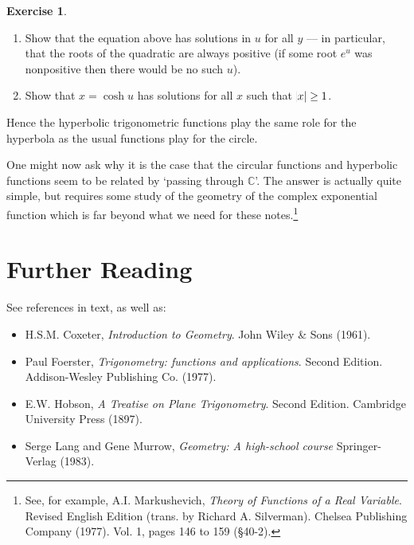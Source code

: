 \documentclass[a4paper,leqno]{article}
\numberwithin{equation}{section}
\theoremstyle{definition}
\newtheorem{exercise}[equation]{Exercise}
\theoremstyle{remark}
\begin{document}
\begin{exercise}\leavevmode
  \begin{enumerate}
    \item Show that the equation above has solutions in $ u $ for all $ y $ --- in particular, that the
          roots of the quadratic are always positive (if some root $ e^u $ was nonpositive then there would
          be no such $ u $).
    \item Show that $ x = \cosh u $ has solutions for all $ x $ such that $ \abs{x} \geq 1 $.
  \end{enumerate}
\end{exercise}

Hence the hyperbolic trigonometric functions play the same role for the hyperbola as the usual functions
play for the circle.

One might now ask why it is the case that the circular functions and hyperbolic functions seem to be
related by `passing through $ \mathbb{C} $'. The answer is actually quite simple, but requires some study
of the geometry of the complex exponential function which is far beyond what we need for these notes.\footnote{See, for example, A.I. Markushevich, \emph{Theory of Functions of a Real Variable}. Revised English Edition (trans. by Richard A. Silverman). Chelsea Publishing Company (1977). Vol. 1, pages 146 to 159 (\S40-2).  }

\section*{Further Reading}
See references in text, as well as:
\begin{itemize}
  \item H.S.M. Coxeter, \emph{Introduction to Geometry}. John Wiley \& Sons (1961).
  \item Paul Foerster, \emph{Trigonometry: functions and applications}. Second Edition. Addison-Wesley Publishing Co. (1977).
  \item E.W. Hobson, \emph{A Treatise on Plane Trigonometry}. Second Edition. Cambridge University Press (1897).
  \item Serge Lang and Gene Murrow, \emph{Geometry: A high-school course} Springer-Verlag (1983).
\end{itemize}
\end{document}
